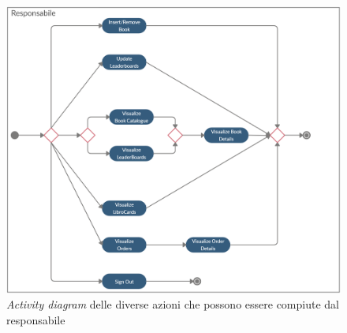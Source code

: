 \documentclass[a4paper,12pt,titlepage]{article}
\begin{document}
{{{\begin{figure}[H]
		\includegraphics[scale=0.45, angle=90]{activityDiagramResponsabile}
		\caption{\textit{Activity diagram} delle diverse azioni che possono essere compiute dal responsabile}
\end{figure}
\cleardoublepage

}}}
\end{document}
